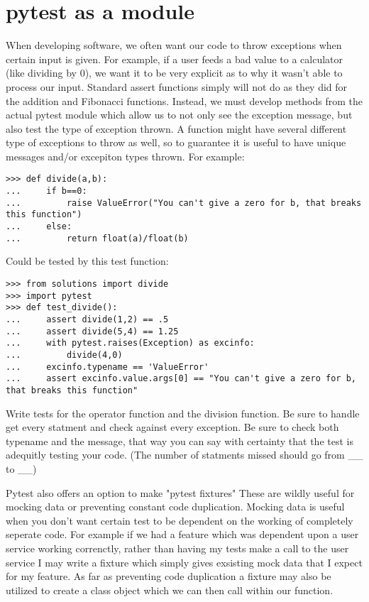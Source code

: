 \section*{pytest as a module}

When developing software, we often want our code to throw exceptions when certain input is given.
For example, if a user feeds a bad value to a calculator (like dividing by 0), we want it to be very explicit as to why it wasn't able to process our input.
Standard assert functions simply will not do as they did for the addition and Fibonacci functions.
Instead, we must develop methods from the actual pytest module which allow us to not only see the exception message, but also test the type of exception thrown.
A function might have several different type of exceptions to throw as well, so to guarantee it is useful to have unique messages and/or excepiton types thrown.
For example:

\begin{lstlisting}
>>> def divide(a,b):
...     if b==0:
...         raise ValueError("You can't give a zero for b, that breaks this function")
...     else:
...         return float(a)/float(b)
\end{lstlisting}
Could be tested by this test function:
\begin{lstlisting}
>>> from solutions import divide
>>> import pytest
>>> def test_divide():
...     assert divide(1,2) == .5
...     assert divide(5,4) == 1.25
...     with pytest.raises(Exception) as excinfo:
...         divide(4,0)
...     excinfo.typename == 'ValueError'
...     assert excinfo.value.args[0] == "You can't give a zero for b, that breaks this function"
\end{lstlisting}

\begin{problem}
Write tests for the operator function and the division function. Be sure to handle get every statment and check against every exception.
Be sure to check both typename and the message, that way you can say with certainty that the test is adequitly testing your code.
(The number of statments missed should go from \_\_ to \_\_)
\end{problem}

Pytest also offers an option to make "pytest fixtures" These are wildly useful for mocking data or preventing constant code duplication.
Mocking data is useful when you don't want certain test to be dependent on the working of completely seperate code.
For example if we had a feature which was dependent upon a user service working correnctly, rather than having my tests make a call to the user service I may write a fixture which simply gives exsisting mock data that I expect for my feature.
As far as preventing code duplication a fixture may also be utilized to create a class object which we can then call within our function.


